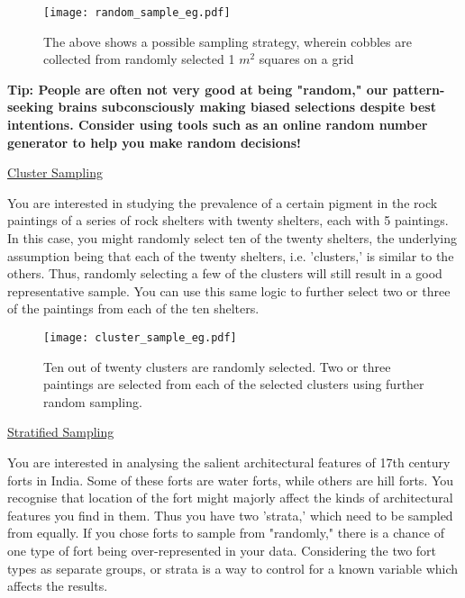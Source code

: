 \documentclass{article}
\begin{document}
\begin{figure}[hbt!]
    \centering
    \texttt{[image: random\_sample\_eg.pdf]}
    \caption{The above shows a possible sampling strategy, wherein cobbles are collected from randomly selected 1 \(m^2\) squares on a grid}
    \label{fig:random_sample_eg}
\end{figure}

\vspace{0.5cm}
\begin{singlespace*}
\textbf{Tip: People are often not very good at being "random," our pattern-seeking brains subconsciously making biased selections despite best intentions. Consider using tools such as an online random number generator to help you make random decisions!}
\end{singlespace*}
\vspace{0.5cm}
\underline{Cluster Sampling}

You are interested in studying the prevalence of a certain pigment in the rock paintings of a series of rock shelters with twenty shelters, each with 5 paintings. In this case, you might randomly select ten of the twenty shelters, the underlying assumption being that each of the twenty shelters, i.e. 'clusters,' is similar to the others. Thus, randomly selecting a few of the clusters will still result in a good representative sample. You can use this same logic to further select two or three of the paintings from each of the ten shelters.

\begin{figure}[hbt!]
    \centering
    \texttt{[image: cluster\_sample\_eg.pdf]}
    \caption{Ten out of twenty clusters are randomly selected. Two or three paintings are selected from each of the selected clusters using further random sampling.}
    \label{fig:cluster_sample_eg}
\end{figure}
\underline{Stratified Sampling}

You are interested in analysing the salient architectural features of 17th century forts in India. Some of these forts are water forts, while others are hill forts. You recognise that location of the fort might majorly affect the kinds of architectural features you find in them. Thus you have two 'strata,' which need to be sampled from equally. If you chose forts to sample from "randomly," there is a chance of one type of fort being over-represented in your data. Considering the two fort types as separate groups, or strata is a way to control for a known variable which affects the results. 
\end{document}
